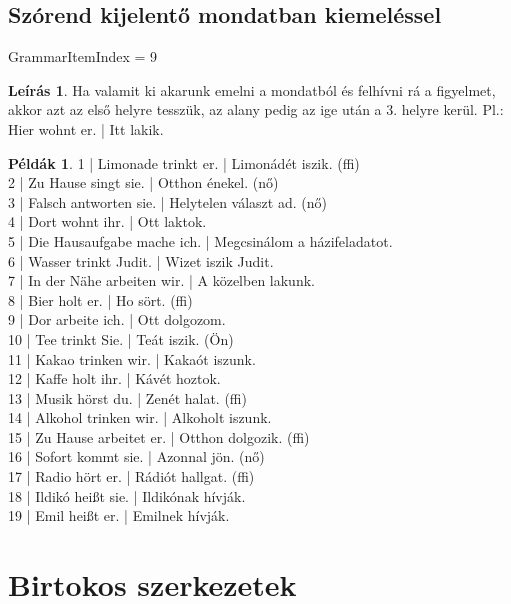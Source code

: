 \documentclass{article}
\theoremstyle{definition}
\newtheorem*{exmp}{Példák}
\newtheorem*{desc}{Leírás}
\begin{document}
\subsection{Szórend kijelentő mondatban kiemeléssel}

GrammarItemIndex = 9

\begin{desc}
Ha valamit ki akarunk emelni a mondatból és felhívni rá a figyelmet,
akkor azt az első helyre tesszük, az alany pedig az ige után a 3. helyre kerül.
Pl.: Hier wohnt er. | Itt lakik.
\end{desc}

\begin{exmp}
1 | Limonade trinkt er. | Limonádét iszik. (ffi)\\
2 | Zu Hause singt sie. | Otthon énekel. (nő)\\
3 | Falsch antworten sie. | Helytelen választ ad. (nő)\\
4 | Dort wohnt ihr. | Ott laktok.\\
5 | Die Hausaufgabe mache ich. | Megcsinálom a házifeladatot.\\
6 | Wasser trinkt Judit. | Wizet iszik Judit.\\
7 | In der Nähe arbeiten wir. | A közelben lakunk.\\
8 | Bier holt er. | Ho sört. (ffi)\\
9 | Dor arbeite ich. | Ott dolgozom.\\
10 | Tee trinkt Sie. | Teát iszik. (Ön)\\
11 | Kakao trinken wir. | Kakaót iszunk.\\
12 | Kaffe holt ihr. | Kávét hoztok.\\
13 | Musik hörst du. | Zenét halat. (ffi)\\
14 | Alkohol trinken wir. | Alkoholt iszunk.\\
15 | Zu Hause arbeitet er. | Otthon dolgozik. (ffi)\\
16 | Sofort kommt sie. | Azonnal jön. (nő)\\
17 | Radio hört er. | Rádiót hallgat. (ffi)\\
18 | Ildikó heißt sie. | Ildikónak hívják.\\
19 | Emil heißt er. | Emilnek hívják.\\
\end{exmp}

\section{Birtokos szerkezetek}
\end{document}
